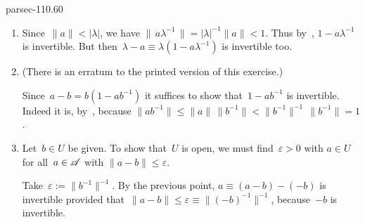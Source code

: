 \documentclass[b5page]{book}
\begin{document}
\begin{solution}{parsec-110.60}
\begin{enumerate}
\item[1.]
Since~$\|a\|<\left|\lambda\right|$,
we have $\| \, a\lambda^{-1}\,\|
= \left|\lambda\right|^{-1}\|a\| <1$.
Thus by~,
$1-a\lambda^{-1}$ is invertible.
But then~$\lambda-a \equiv \lambda (1-a\lambda^{-1})$
is invertible too.
\item[2.]
(There is an erratum to the printed
        version of this exercise.)

Since~$a-b = b(1-ab^{-1})$
it suffices to show
        that~$1-ab^{-1}$ is invertible.
    Indeed it is, by~,
        because $\|ab^{-1}\|\leq \|a\|\,\|b^{-1}\| < 
        \|b^{-1}\|^{-1}\,\|b^{-1}\| = 1$.

\item[3.]
Let~$b\in U$ be given.
To show that~$U$ is open,
we must find~$\varepsilon>0$
with $a\in U$ for all~$a\in\mathscr{A}$ with $\|a-b\|\leq \varepsilon$.

Take~$\varepsilon:= \|b^{-1}\|^{-1}$. 
By the previous point,
        $a\equiv (a-b)-(-b)$
        is invertible
        provided that~$\|a-b\|\leq \varepsilon \equiv \|(-b)^{-1}\|^{-1}$,
        because~$-b$ is invertible.
\end{enumerate}
\end{solution}
\end{document}
